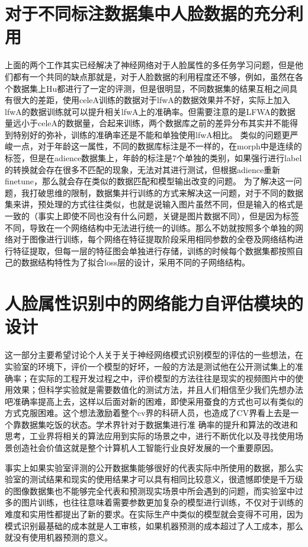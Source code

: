 \section{对于不同标注数据集中人脸数据的充分利用}
上面的两个工作其实已经解决了神经网络对于人脸属性的多任务学习问题，但是他们都有一个共同的缺点那就是，对于人脸数据的利用程度还不够，例如，虽然在各个数据集上Hu都进行了一定的评测，但是很明显，不同数据集的结果互相之间具有很大的差距，使用celeA训练的数据对于lfwA的数据效果并不好，实际上加入lfwA的数据训练就可以提升相关lfwA上的准确率。但需要注意的是LFWA的数据量远小于celeA的数据量，合起来训练，两个数据库之前的差异分布其实并不能得到特别好的弥补，训练的准确率还是不能和单独使用lfwA相比。
类似的问题更严峻一点，对于年龄这一属性，不同的数据库标注是不一样的，在morph中是连续的标签，但是在adience数据集上，年龄的标注是7个单独的类别，如果强行进行label的转换就会存在很多不匹配的现象，无法对其进行测试，但根据adience重新finetune，那么就会存在类似的数据匹配和模型输出改变的问题。
为了解决这一问题，我打破思维的限制，数据集并行训练的方式来解决这一问题，对于不同的数据集来讲，预处理的方式往往类似，也就是说输入图片虽然不同，但是输入的格式是一致的（事实上即使不同也没有什么问题，关键是图片数据不同），但是因为标签不同，导致在一个网络结构中无法进行统一的训练。那么不妨就按照多个单独的网络对于图像进行训练，每个网络在特征提取阶段采用相同参数的全卷及网络结构进行特征提取，但每一层的特征图会单独进行存储，训练的时候每个数据集都按照自己的数据结构特性为了拟合loss层的设计，采用不同的子网络结构。



\section{人脸属性识别中的网络能力自评估模块的设计}
这一部分主要希望讨论个人关于关于神经网络模式识别模型的评估的一些想法，在实验室的环境下，评价一个模型的好坏，一般的方法是测试他在公开测试集上的准确率；在实际的工程开发过程之中，评价模型的方法往往是现实的视频图片中的使用效果；但科学实验就是需要数值化的测试方法，并且人们相信至少我们先想办法吧准确率提高上去，这样以后面对新的困难，即使采用蚕食的方式也可以有类似的方式克服困难。这个想法激励着整个cv界的科研人员，也造成了CV界看上去是一个靠数据集吃饭的状态。学术界针对于数据集进行准 确率的提升和算法的改进和思考，工业界将相关的算法应用到实际的场景之中，进行不断优化以及寻找使用场景创造社会价值这就是整个计算机人工智能行业良好发展的一个重要原因。

事实上如果实验室评测的公开数据集能够很好的代表实际中所使用的数据，那么实验室的测试结果和现实的使用结果才可以具有相同比较意义，很遗憾即使是千万级的图像数据集也不能够完全代表和预测现实场景中所会遇到的问题，而实验室中过多的图片训练，也往往意味着需要参数更加复杂的模型进行训练，不仅对于训练的难度和实用性都提出了新的要求。在实际生产中类似的模型就会变得不可用，因为模式识别最基础的成本就是人工审核，如果机器预测的成本超过了人工成本，那么就没有使用机器预测的意义。


